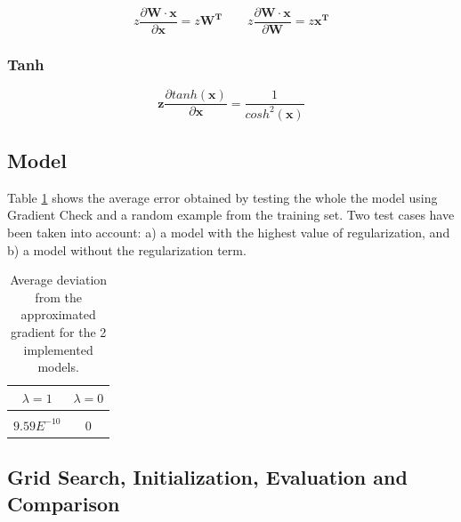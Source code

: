 \documentclass{article} %
\begin{document}
\begin{equation}
z\frac{\partial \bm{W} \cdot \bm{x}}{\partial \bm{x}} = z\bm{W^T}
\qquad
z\frac{\partial \bm{W} \cdot \bm{x}}{\partial \bm{W}} = z\bm{x^T}
\end{equation}

\subsubsection*{Tanh}

\begin{equation}
\bm{z}\frac{\partial tanh(\bm{x})}{\partial \bm{x}} = \frac{1}{cosh^2(\bm{x})}
\end{equation}

\subsection{Model}

Table \ref{table:rnn} shows the average error obtained by testing the whole the model using Gradient Check and a random example from the training set. Two test cases have been taken into account: a) a model with the highest value of regularization, and b) a model without the regularization term.

\begin{table}[!htp]
\caption{Average deviation from the approximated gradient for the 2 implemented models.}
\label{table:rnn}
\begin{center}
\begin{tabular}{c c}
\textbf{$\lambda=1$} & \textbf{$\lambda=0$}\\
\hline \\
$9.59E^{-10}$ & $0$\\
\end{tabular}
\end{center}
\end{table}

\subsection{Grid Search, Initialization, Evaluation and Comparison}
\end{document}
